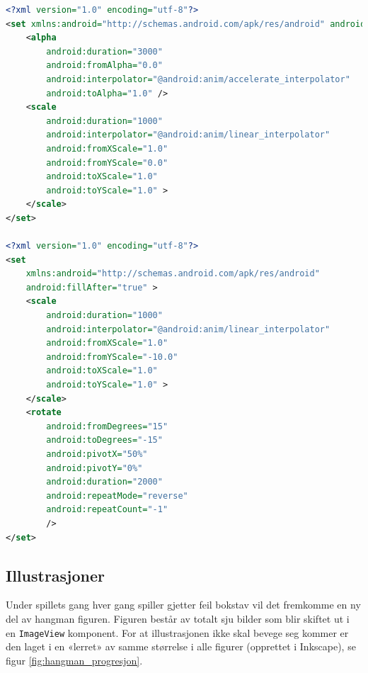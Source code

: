 \begin{lstlisting}[language=XML, caption=Konfigurasjon for samtlige animasjoner i startskjerm, label=xml:animasjoner]
<?xml version="1.0" encoding="utf-8"?>
<set xmlns:android="http://schemas.android.com/apk/res/android" android:fillAfter="true">
    <alpha
        android:duration="3000"
        android:fromAlpha="0.0"
        android:interpolator="@android:anim/accelerate_interpolator"
        android:toAlpha="1.0" />
    <scale
        android:duration="1000"
        android:interpolator="@android:anim/linear_interpolator"
        android:fromXScale="1.0"
        android:fromYScale="0.0"
        android:toXScale="1.0"
        android:toYScale="1.0" >
    </scale>
</set>

<?xml version="1.0" encoding="utf-8"?>
<set
    xmlns:android="http://schemas.android.com/apk/res/android"
    android:fillAfter="true" >
    <scale
        android:duration="1000"
        android:interpolator="@android:anim/linear_interpolator"
        android:fromXScale="1.0"
        android:fromYScale="-10.0"
        android:toXScale="1.0"
        android:toYScale="1.0" >
    </scale>
    <rotate
        android:fromDegrees="15"
        android:toDegrees="-15"
        android:pivotX="50%"
        android:pivotY="0%"
        android:duration="2000"
        android:repeatMode="reverse"
        android:repeatCount="-1"
        />
</set>
\end{lstlisting}



\subsection{Illustrasjoner}

Under spillets gang hver gang spiller gjetter feil bokstav vil det fremkomme en ny del av hangman figuren. Figuren består av totalt sju bilder som blir skiftet ut i en \texttt{ImageView} komponent. For at illustrasjonen ikke skal bevege seg kommer er den laget i en «lerret» av samme størrelse i alle figurer (opprettet i Inkscape), se figur \ref{fig:hangman_progresjon}.

